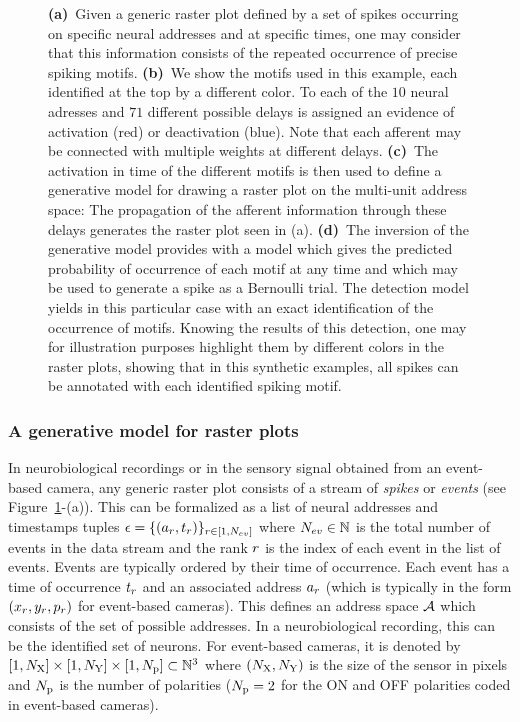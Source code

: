 \documentclass[default]{sn-jnl}%
\theoremstyle{thmstyleone}%
\theoremstyle{thmstyletwo}%
\theoremstyle{thmstylethree}%
\begin{document}
\begin{figure}
{	    {\bf (a)}~Given a generic raster plot defined by a set of spikes occurring on specific neural addresses and at specific times, one may consider that this information consists of the repeated occurrence of precise spiking motifs. 
	    {\bf (b)}~We show the motifs used in this example, each identified at the top by a different color. To each of the $10$ neural adresses and $71$ different possible delays is assigned an evidence of activation (red) or deactivation (blue). Note that each afferent may be connected with multiple weights at different delays.
	    {\bf (c)}~The activation in time of the different motifs is then used to define a generative model for drawing a raster plot on the multi-unit address space: The propagation of the afferent information through these delays generates the raster plot seen in (a). 
	    {\bf (d)}~The inversion of the generative model provides with a model which gives the predicted probability of occurrence of each motif at any time and which may be used to generate a spike as a Bernoulli trial. The detection model yields in this particular case with an exact identification of the occurrence of motifs. Knowing the results of this detection, one may for illustration purposes highlight them by different colors in the raster plots, showing that in this synthetic examples, all spikes can be annotated with each identified spiking motif. 
	    }
    \label{fig:model}
\end{figure}
% 
\subsubsection{A generative model for raster plots}
%
In neurobiological recordings or in the sensory signal obtained from an event-based camera, any generic raster plot consists of a stream of \emph{spikes} or \emph{events} (see Figure~\ref{fig:model}-(a)). This can be formalized as a list of neural addresses and timestamps tuples $\epsilon = \{(a_r, t_r)\}_{r \in [1,N_{ev}]}$ where $N_{ev} \in \mathbb{N} $ is the total number of events in the data stream and the rank $r$ is the index of each event in the list of events. Events are typically ordered by their time of occurrence. Each event has a time of occurrence $t_r$  and an associated address $a_r$ (which is typically in the form $(x_r, y_r, p_r)$ for event-based cameras). This defines an address space $\mathcal{A}$ which consists of the set of possible addresses. In a neurobiological recording, this can be the identified set of neurons. For event-based cameras, it is denoted by $[1, N_\text{X}]\times[1, N_\text{Y}] \times [1, N_\text{p}] \subset \mathbb{N}^3$ where $(N_\text{X}, N_\text{Y})$ is the size of the sensor in pixels and $N_\text{p}$ is the number of polarities ($N_\text{p}=2$ for the ON and OFF polarities coded in event-based cameras). 
\end{document}
